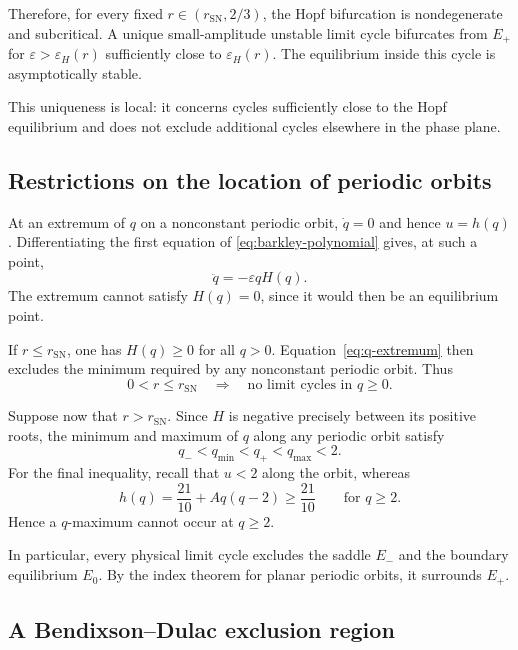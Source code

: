 \documentclass[11pt,reqno]{amsart}
\theoremstyle{plain}
\theoremstyle{definition}
\theoremstyle{remark}
\begin{document}
Therefore, for every fixed
$r\in(r_{\mathrm{SN}},2/3)$, the Hopf bifurcation is
nondegenerate and subcritical. A unique small-amplitude
unstable limit cycle bifurcates from $E_+$ for
$\varepsilon>\varepsilon_H(r)$ sufficiently close to
$\varepsilon_H(r)$. The equilibrium inside this cycle
is asymptotically stable.

This uniqueness is local: it concerns cycles sufficiently
close to the Hopf equilibrium and does not exclude additional
cycles elsewhere in the phase plane.


\subsection{Restrictions on the location of periodic orbits}
\label{subsec:cycle-location}

At an extremum of $q$ on a nonconstant periodic orbit,
$\dot q=0$ and hence $u=h(q)$. Differentiating the first
equation of \eqref{eq:barkley-polynomial} gives, at such a point,
\begin{equation}
\ddot q=-\varepsilon qH(q).
\label{eq:q-extremum}
\end{equation}
The extremum cannot satisfy $H(q)=0$, since it would then
be an equilibrium point.

If $r\leq r_{\mathrm{SN}}$, one has $H(q)\geq0$ for all
$q>0$. Equation~\eqref{eq:q-extremum} then excludes the
minimum required by any nonconstant periodic orbit.
Thus
\begin{equation}
0<r\leq r_{\mathrm{SN}}
\quad\Longrightarrow\quad
\text{no limit cycles in }q\geq0.
\label{eq:no-cycles-small-r}
\end{equation}

Suppose now that $r>r_{\mathrm{SN}}$. Since $H$ is negative
precisely between its positive roots, the minimum and maximum
of $q$ along any periodic orbit satisfy
\begin{equation}
q_-<q_{\min}<q_+<q_{\max}<2.
\label{eq:cycle-location}
\end{equation}
For the final inequality, recall that $u<2$ along the orbit,
whereas
\[
h(q)=\frac{21}{10}+Aq(q-2)\geq\frac{21}{10}
\qquad\text{for }q\geq2.
\]
Hence a $q$-maximum cannot occur at $q\geq2$.

In particular, every physical limit cycle excludes the saddle
$E_-$ and the boundary equilibrium $E_0$. By the index
theorem for planar periodic orbits, it surrounds $E_+$.


\subsection{A Bendixson--Dulac exclusion region}
\label{subsec:dulac}
\end{document}
